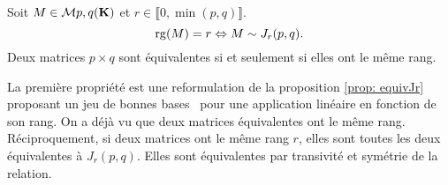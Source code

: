 \begin{propn}
  Soit $M \in \mathcal{M}{p,q}(\mathbf{K})$ et $r\in \llbracket 0, \min(p,q)\rrbracket$.
\[
  \mathop{\mathrm{rg}}(M) = r \Leftrightarrow M \sim J_r(p,q).
\]
  Deux matrices $p\times q$ sont équivalentes si et seulement si elles ont le même rang.
\end{propn}
\begin{demo}
 La première propriété est une reformulation de la proposition \ref{prop: equivJr} proposant un jeu de \og bonnes bases\fg~ pour une application linéaire en fonction de son rang.\newline
 On a déjà vu que deux matrices équivalentes ont le même rang. Réciproquement, si deux matrices ont le même rang $r$, elles sont toutes les deux équivalentes à $J_r(p,q)$. Elles sont équivalentes par transivité et symétrie de la relation.
\end{demo}

